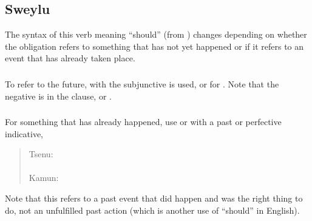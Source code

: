 \subsection{Sweylu} \label{syn:sweylu} The syntax of this verb meaning
``should'' (from  ) changes depending on
whether the obligation refers to something that has not yet happened or
if it refers to an event that has already taken place.

\subsubsection{} To refer to the future,  with the subjunctive
is used,  or  for .  Note that the negative is
in the  clause,  or  .

\subsubsection{} For something that has already happened, use 
or  with a past or perfective indicative,

\begin{quotation}
\noindent Tsenu: \\
\noindent{} \\

\noindent Kamun: \\
\noindent{}
\end{quotation}

\noindent Note that this refers to a past event that did happen and
was the right thing to do, not an unfulfilled past action (which is
another use of ``should'' in English).
